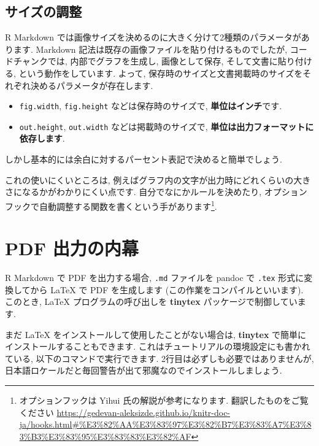 \documentclass[
]{ltjsarticle}
\begin{document}
\hypertarget{ux30b5ux30a4ux30baux306eux8abfux6574}{%
\subsection{サイズの調整}\label{ux30b5ux30a4ux30baux306eux8abfux6574}}

R Markdown では画像サイズを決めるのに大きく分けて2種類のパラメータがあります. Markdown 記法は既存の画像ファイルを貼り付けるものでしたが, コードチャンクでは, 内部でグラフを生成し, 画像として保存, そして文書に貼り付ける, という動作をしています. よって, 保存時のサイズと文書掲載時のサイズをそれぞれ決めるパラメータが存在します.

\begin{itemize}
\item
  \texttt{fig.width}, \texttt{fig.height} などは保存時のサイズで, \textbf{単位はインチ}です.
\item
  \texttt{out.height}, \texttt{out.width} などは掲載時のサイズで, \textbf{単位は出力フォーマットに依存します}.
\end{itemize}

しかし基本的には余白に対するパーセント表記で決めると簡単でしょう.

これの使いにくいところは, 例えばグラフ内の文字が出力時にどれくらいの大きさになるかがわかりにくい点です. 自分でなにかルールを決めたり, オプションフックで自動調整する関数を書くという手があります\footnote{オプションフックは Yihui 氏の解説が参考になります. 翻訳したものをご覧ください \url{https://gedevan-aleksizde.github.io/knitr-doc-ja/hooks.html\#\%E3\%82\%AA\%E3\%83\%97\%E3\%82\%B7\%E3\%83\%A7\%E3\%83\%B3\%E3\%83\%95\%E3\%83\%83\%E3\%82\%AF}}.

\hypertarget{pdf-intro}{%
\section{PDF 出力の内幕}\label{pdf-intro}}

R Markdown で PDF を出力する場合, \texttt{.md} ファイルを pandoc で \texttt{.tex} 形式に変換してから LaTeX で PDF を生成します (この作業をコンパイルといいます). このとき, LaTeX プログラムの呼び出しを \textbf{tinytex} パッケージで制御しています.

まだ LaTeX をインストールして使用したことがない場合は, \textbf{tinytex} で簡単にインストールすることもできます. これはチュートリアルの環境設定にも書かれている, 以下のコマンドで実行できます. 2行目は必ずしも必要ではありませんが, 日本語ロケールだと毎回警告が出て邪魔なのでインストールしましょう.
\end{document}
